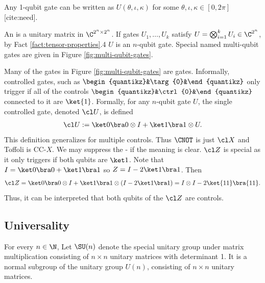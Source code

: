 \begin{fact}
Any 1-qubit gate can be written as $U(\theta,\iota,\kappa)$ for some $\theta,\iota,\kappa \in [0,2\pi]$ [cite:need].
\end{fact}

\begin{definition}
An  is a unitary matrix in $\C^{2^n \times 2^n}$. If gates $U_1, \ldots, U_k$ satisfy $U = \bigotimes_{i=1}^k U_i \in \C^{2^n}$, by Fact \ref{fact:tensor-properties}.4 $U$ is an $n$-qubit gate. Special named multi-qubit gates are given in Figure \ref{fig:multi-qubit-gates}.
\end{definition}



\begin{definition}
Many of the gates in Figure \ref{fig:multi-qubit-gates} are  gates. Informally, controlled gates, such as $\begin{quantikz}&\targ{0}&\end{quantikz}$ only trigger if all of the controls $\begin{quantikz}&\ctrl{0}&\end{quantikz}$ connected to it are $\ket{1}$. Formally, for any $n$-qubit gate $U$, the single controlled gate, denoted $\cl U$, is defined
\begin{align}
    \cl U := \ket0 \bra0 \otimes I + \ket1 \bra1 \otimes U.
\end{align}
This definition generalizes for multiple controls. Thus $\CNOT$ is just $\cl X$ and Toffoli is $\text{CC-}X$. We may suppress the - if the meaning is clear. $\cl Z$ is special as it only triggers if both qubits are $\ket1$. Note that $I = \ket0 \bra0 + \ket1 \bra1$ so $Z = I - 2 \ket1 \bra1$. Then
\begin{align*}
    \cl Z 
    = \ket0 \bra0 \otimes I + \ket1 \bra1 \otimes (I - 2 \ket1 \bra1)
    = I \otimes I - 2 \ket{11} \bra{11}.
\end{align*}
Thus, it can be interpreted that both qubits of the $\cl Z$ are controls.
\end{definition}

\subsection{Universality}

\begin{definition}
For every $n \in \N$, Let $\SU(n)$ denote the special unitary group under matrix multiplication consisting of $n \times n$ unitary matrices with determinant 1. It is a normal subgroup of the unitary group $U(n)$, consisting of $n \times n$ unitary matrices.
\end{definition}

